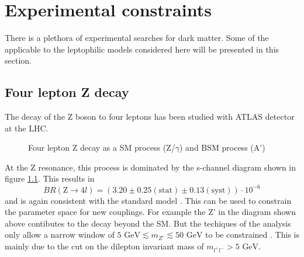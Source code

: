 \chapter{Experimental constraints}
\label{ch:ExConst}
There is a plethora of experimental searches for dark matter. Some of the applicable to the leptophilic models considered here will be presented in this section. 
\section{Four lepton Z decay}
The decay of the Z boson to four leptons has been studied with ATLAS detector at the LHC. 
\begin{figure}[H]
\centering
{}
\caption{Four lepton Z decay as a SM process (Z/$\gamma$) and BSM process (A')}
\label{fg:ZtoFourL}
\end{figure}
At the Z resonance, this process is dominated by the s-channel diagram shown in figure \ref{fg:ZtoFourL}.
This results in 
\begin{equation}
BR(\text{Z}\rightarrow 4l) = (3.20\pm 0.25 (\text{stat})\pm 0.13 (\text{syst}))\cdot 10^{-6}
\end{equation}
and is again consistent with the standard model \cite{Aad:2014wra}. This can be used to constrain the parameter space for new couplings. For example the Z' in the diagram shown above contibutes to the decay beyond the SM. But the techiques of the analysis only allow a narrow window of $5\text{ GeV} \lesssim m_{Z'}\lesssim 50 \text{ GeV}$ to be constrained \cite{Altmannshofer:2014pba}. This is mainly due to the cut on the dilepton invariant mass of $m_{l^+l^-}>5\text{ GeV}$.
